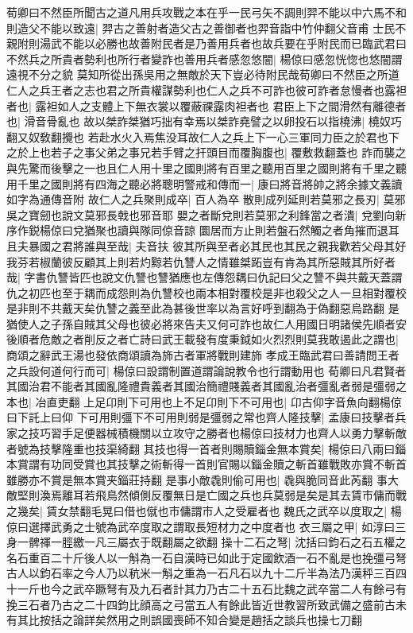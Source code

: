荀卿曰不然臣所聞古之道凡用兵攻戰之本在乎一民弓矢不調則羿不能以中六馬不和則造父不能以致遠|{
	羿古之善射者造父古之善御者也羿音詣中竹仲翻父音甫}
士民不親附則湯武不能以必勝也故善附民者是乃善用兵者也故兵要在乎附民而已臨武君曰不然兵之所貴者勢利也所行者變詐也善用兵者感忽悠闇|{
	楊倞曰感忽恍惚也悠闇謂遠視不分之貌}
莫知所從出孫吳用之無敵於天下豈必待附民哉荀卿曰不然臣之所道仁人之兵王者之志也君之所貴權謀勢利也仁人之兵不可詐也彼可詐者怠慢者也露袒者也|{
	露袒如人之支體上下無衣裳以覆蔽祼露肉袒者也}
君臣上下之間滑然有離德者也|{
	滑音骨亂也}
故以桀詐桀猶巧拙有幸焉以桀詐堯譬之以卵投石以指橈沸|{
	橈奴巧翻又奴敎翻攪也}
若赴水火入焉焦没耳故仁人之兵上下一心三軍同力臣之於君也下之於上也若子之事父弟之事兄若手臂之扞頭目而覆胸腹也|{
	覆敷救翻蓋也}
詐而襲之與先驚而後擊之一也且仁人用十里之國則將有百里之聽用百里之國則將有千里之聽用千里之國則將有四海之聽必將聰明警戒和傳而一|{
	康曰將音將帥之將余據文義讀如字為通傳音附}
故仁人之兵聚則成卒|{
	百人為卒}
散則成列延則若莫邪之長刃|{
	莫邪吳之寶劒也說文莫邪長戟也邪音耶}
嬰之者斷兌則若莫邪之利鋒當之者潰|{
	兌劉向新序作鋭楊倞曰兌猶聚也讀與隊同倞音諒}
圜居而方止則若盤石然觸之者角摧而退耳且夫暴國之君將誰與至哉|{
	夫音扶}
彼其所與至者必其民也其民之親我歡若父母其好我芬若椒蘭彼反顧其上則若灼黥若仇讐人之情雖桀跖豈有肯為其所惡賊其所好者哉|{
	字書仇讐皆匹也說文仇讐也讐猶應也左傳怨耦曰仇記曰父之讐不與共戴天蓋謂仇之初匹也至于耦而成怨則為仇讐校也兩本相對覆校是非也殺父之人一旦相對覆校是非則不共戴天矣仇讐之義至此為甚後世率以為言好呼到翻為于偽翻惡烏路翻}
是猶使人之子孫自賊其父母也彼必將來告夫又何可詐也故仁人用國日明諸侯先順者安後順者危敵之者削反之者亡詩曰武王載發有度秉鉞如火烈烈則莫我敢遏此之謂也|{
	商頌之辭武王湯也發依商頌讀為斾古者軍將戰則建斾}
孝成王臨武君曰善請問王者之兵設何道何行而可|{
	楊倞曰設謂制置道謂論說教令也行謂動用也}
荀卿曰凡君賢者其國治君不能者其國亂隆禮貴義者其國治簡禮賤義者其國亂治者彊亂者弱是彊弱之本也|{
	冶直吏翻}
上足卬則下可用也上不足卬則下不可用也|{
	卬古仰字音魚向翻楊倞曰下託上曰仰}
下可用則彊下不可用則弱是彊弱之常也齊人隆技擊|{
	孟康曰技擊者兵家之技巧習手足便器械積機關以立攻守之勝者也楊倞曰技材力也齊人以勇力擊斬敵者號為技擊隆重也技渠綺翻}
其技也得一首者則賜贖錙金無本賞矣|{
	楊倞曰八兩曰錙本賞謂有功同受賞也其技擊之術斬得一首則官賜以錙金贖之斬首雖戰敗亦賞不斬首雖勝亦不賞是無本賞夹錙莊持翻}
是事小敵毳則偷可用也|{
	毳與脆同音此芮翻}
事大敵堅則渙焉離耳若飛鳥然傾側反覆無日是亡國之兵也兵莫弱是矣是其去賃市傭而戰之幾矣|{
	賃女禁翻毛晃曰借也僦也市傭謂市人之受雇者也}
魏氏之武卒以度取之|{
	楊倞曰選擇武勇之士號為武卒度取之謂取長短材力之中度者也}
衣三屬之甲|{
	如淳曰三身一髀禈一脛繳一凡三屬衣于既翻屬之欲翻}
操十二石之弩|{
	沈括曰鈞石之石五權之名石重百二十斤後人以一斛為一石自漢時已如此于定國飲酒一石不亂是也挽彊弓弩古人以鈞石率之今人乃以秔米一斛之重為一石凡石以九十二斤半為法乃漢秤三百四十一斤也今之武卒蹶弩有及九石者計其力乃古二十五石比魏之武卒當二人有餘弓有挽三石者乃古之二十四鈞比顔高之弓當五人有餘此皆近世教習所致武備之盛前古未有其比按括之論詳矣然用之則誤國喪師不知合變是趙括之談兵也操七刀翻}
